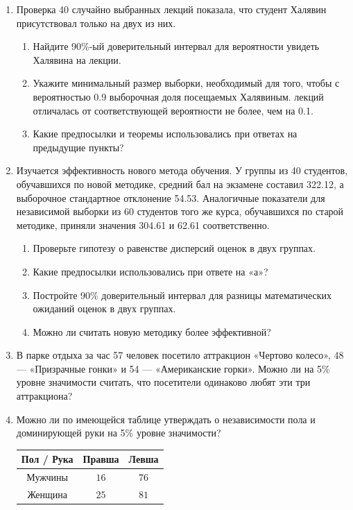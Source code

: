 \begin{enumerate}
\item Проверка 40 случайно выбранных лекций показала, что студент
Халявин присутствовал только на двух из них.
\begin{enumerate}
\item Найдите 90\%-ый доверительный интервал для вероятности
увидеть Халявина на лекции.
\item Укажите минимальный размер выборки, необходимый для того,
чтобы с вероятностью 0.9 выборочная доля посещаемых Халявиным.
лекций отличалась от соответствующей вероятности не более, чем на 0.1.
\item Какие предпосылки и теоремы использовались при ответах на предыдущие пункты?
\end{enumerate}

\item Изучается эффективность нового метода обучения. У группы из 40
студентов, обучавшихся по новой методике, средний бал на экзамене
составил 322.12, а выборочное стандартное отклонение 54.53.
Аналогичные показатели для независимой выборки из 60 студентов
того же курса, обучавшихся по старой методике,
приняли значения 304.61 и 62.61 соответственно.
\begin{enumerate}
\item Проверьте гипотезу о равенстве дисперсий оценок в двух
группах.
\item Какие предпосылки использовались при ответе на «а»?
\item Постройте 90\% доверительный интервал для разницы
математических ожиданий оценок в двух группах.
\item Можно ли считать новую методику более эффективной?
\end{enumerate}

\item В парке отдыха за час 57 человек посетило аттракцион «Чертово
колесо», 48 — «Призрачные гонки» и 54 — «Американские горки».
Можно ли на 5\% уровне значимости считать, что посетители
одинаково любят эти три аттракциона?

\item Можно ли по имеющейся таблице утверждать о независимости пола и
доминирующей руки на 5\% уровне значимости?

\begin{tabular}{@{}ccc@{}}
\toprule
Пол / Рука & Правша & Левша \\ \midrule
Мужчины    & $16$     & $76$    \\
Женщина    & $25$     & $81$ \\ \bottomrule
\end{tabular}


\end{enumerate}
